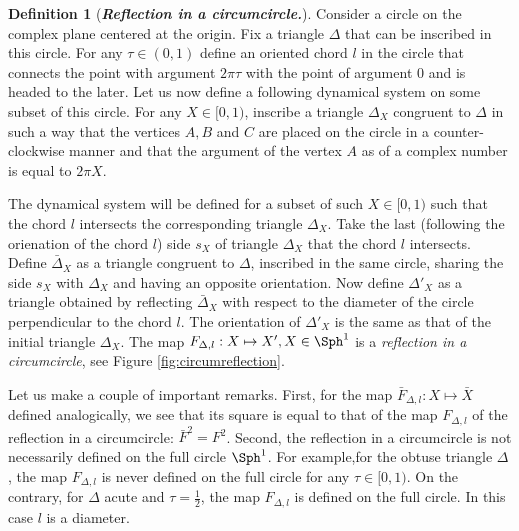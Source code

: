 \documentclass[12pt]{article}
\theoremstyle{definition}
\newtheorem{definition}{Definition}
\begin{document}
%

\begin{definition}[\textbf{\emph{Reflection in a circumcircle.}}]\label{def:reflection_in_a_circumcircle:2}
Consider a circle on the complex plane centered at the origin. Fix a triangle $\Delta$ that can be inscribed in this circle. For any $\tau \in (0, 1)$ define an oriented chord $l$ in the circle that connects the point with argument $2 \pi \tau$ with the point of argument $0$ and is headed to the later. Let us now define a following dynamical system on some subset of this circle. For any $X \in [0,1)$, inscribe a triangle $\Delta_X$ congruent to $\Delta$ in such a way that the vertices $A, B$ and $C$ are placed on the circle in a counter-clockwise manner and that the argument of the vertex $A$ as of a complex number is equal to $2 \pi X$.

The dynamical system will be defined for a subset of such $X \in [0,1)$ such that the chord $l$ intersects the corresponding triangle $\Delta_X$. Take the last (following the orienation of the chord $l$) side $s_X$ of triangle $\Delta_X$ that the chord $l$ intersects. Define $\bar{\Delta}_X$ as a triangle congruent to $\Delta$, inscribed in the same circle, sharing the side $s_X$ with $\Delta_X$ and having an opposite orientation. Now define $\Delta'_X$ as a triangle obtained by reflecting $\bar{\Delta}_X$ with respect to the diameter of the circle perpendicular to the chord $l$. The orientation of $\Delta'_X$ is the same as that of the initial triangle $\Delta_X$. The map $F_{\Delta, l}: X \mapsto X', X \in \Sph^1$ is a \emph{reflection in a circumcircle}, see Figure \ref{fig:circumreflection}. 
\end{definition}

Let us make a couple of important remarks. First, for the map $\bar{F}_{\Delta, l}: X \mapsto \bar{X}$ defined analogically, we see that its square is equal to that of the map $F_{\Delta, l}$ of the reflection in a circumcircle: $\bar{F}^2=F^2$. Second, the reflection in a circumcircle is not necessarily defined on the full circle $\Sph^1$. For example,for the obtuse triangle $\Delta$, the map $F_{\Delta, l}$ is never defined on the full circle for any $\tau \in [0,1)$. On the contrary, for $\Delta$ acute and $\tau=\frac{1}{2}$, the map $F_{\Delta, l}$ is defined on the full circle. In this case $l$ is a diameter.
\end{document}
